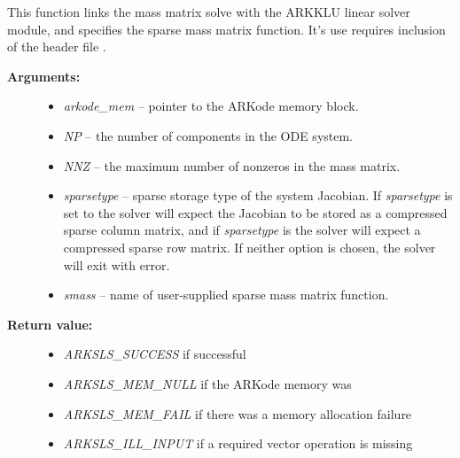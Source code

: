\documentclass[letterpaper,10pt,english]{sphinxmanual}
\begin{document}
\begin{fulllineitems}
\label{c_interface/User_callable:c.ARKMassKLU}
This function links the mass matrix solve with the ARKKLU linear
solver module, and specifies the sparse mass matrix function.  It's
use requires inclusion of the header file .
\begin{description}
\item[{\textbf{Arguments:}}] \leavevmode\begin{itemize}
\item {} 
\emph{arkode\_mem} -- pointer to the ARKode memory block.

\item {} 
\emph{NP} -- the number of components in the ODE system.

\item {} 
\emph{NNZ} -- the maximum number of nonzeros in the mass matrix.

\item {} 
\emph{sparsetype} -- sparse storage type of the system Jacobian.
If \emph{sparsetype} is set to  the solver will expect
the Jacobian to be stored as a compressed sparse column
matrix, and if \emph{sparsetype} is  the solver will
expect a compressed sparse row matrix.  If neither option is
chosen, the solver will exit with error.

\item {} 
\emph{smass} -- name of user-supplied sparse mass matrix function.

\end{itemize}

\item[{\textbf{Return value:}}] \leavevmode\begin{itemize}
\item {} 
\emph{ARKSLS\_SUCCESS}   if successful

\item {} 
\emph{ARKSLS\_MEM\_NULL}  if the ARKode memory was 

\item {} 
\emph{ARKSLS\_MEM\_FAIL}  if there was a memory allocation failure

\item {} 
\emph{ARKSLS\_ILL\_INPUT} if a required vector operation is missing


\end{itemize}
\end{description}
\end{fulllineitems}
\end{document}
